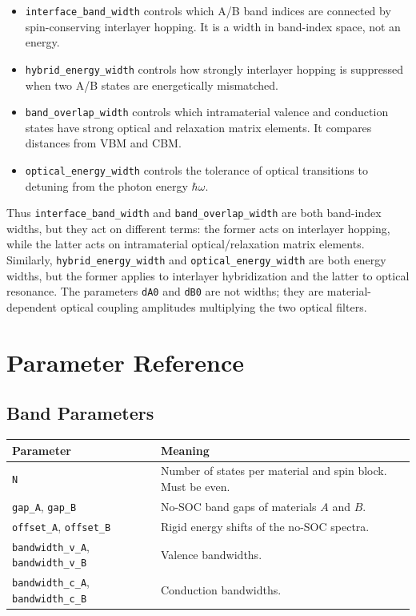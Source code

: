 \documentclass[11pt,a4paper]{article}
\begin{document}
\begin{itemize}[leftmargin=2em]
  \item \texttt{interface\_band\_width} controls which A/B band indices are connected by spin-conserving interlayer hopping.  It is a width in band-index space, not an energy.
  \item \texttt{hybrid\_energy\_width} controls how strongly interlayer hopping is suppressed when two A/B states are energetically mismatched.
  \item \texttt{band\_overlap\_width} controls which intramaterial valence and conduction states have strong optical and relaxation matrix elements.  It compares distances from VBM and CBM.
  \item \texttt{optical\_energy\_width} controls the tolerance of optical transitions to detuning from the photon energy $\hbar\omega$.
\end{itemize}

Thus \texttt{interface\_band\_width} and \texttt{band\_overlap\_width} are both band-index widths, but they act on different terms: the former acts on interlayer hopping, while the latter acts on intramaterial optical/relaxation matrix elements.  Similarly, \texttt{hybrid\_energy\_width} and \texttt{optical\_energy\_width} are both energy widths, but the former applies to interlayer hybridization and the latter to optical resonance.  The parameters \texttt{dA0} and \texttt{dB0} are not widths; they are material-dependent optical coupling amplitudes multiplying the two optical filters.

\section{Parameter Reference}

\subsection{Band Parameters}

\begin{longtable}{p{}p{}}
\toprule
Parameter & Meaning \\
\midrule
\texttt{N} & Number of states per material and spin block.  Must be even. \\
\texttt{gap\_A}, \texttt{gap\_B} & No-SOC band gaps of materials $A$ and $B$. \\
\texttt{offset\_A}, \texttt{offset\_B} & Rigid energy shifts of the no-SOC spectra. \\
\texttt{bandwidth\_v\_A}, \texttt{bandwidth\_v\_B} & Valence bandwidths. \\
\texttt{bandwidth\_c\_A}, \texttt{bandwidth\_c\_B} & Conduction bandwidths. \\
\bottomrule
\end{longtable}
\end{document}
